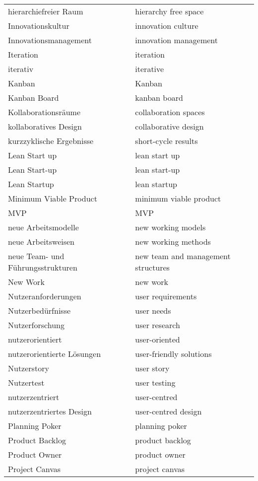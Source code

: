 \begin{spacing}{.5}
\begin{longtable}{ p{} p{}}
    hierarchiefreier Raum & hierarchy free space \\
    Innovationskultur & innovation culture \\
    Innovationsmanagement & innovation management \\
    Iteration & iteration \\
    iterativ & iterative \\
    Kanban & Kanban \\
    Kanban Board & kanban board \\
    Kollaborationsräume & collaboration spaces \\
    kollaboratives Design & collaborative design \\
    kurzzyklische Ergebnisse & short-cycle results \\
    Lean Start up & lean start up \\
    Lean Start-up & lean start-up \\
    Lean Startup & lean startup \\
    Minimum Viable Product & minimum viable product \\
    MVP & MVP \\
    neue Arbeitsmodelle & new working models \\
    neue Arbeitsweisen & new working methods \\
    neue Team- und Führungsstrukturen & new team and management structures \\
    New Work & new work \\
    Nutzeranforderungen & user requirements \\
    Nutzerbedürfnisse & user needs \\
    Nutzerforschung & user research \\
    nutzerorientiert & user-oriented \\
    nutzerorientierte Lösungen & user-friendly solutions \\
    Nutzerstory & user story \\
    Nutzertest & user testing \\
    nutzerzentriert & user-centred \\
    nutzerzentriertes Design & user-centred design \\
    Planning Poker & planning poker \\
    Product Backlog & product backlog \\
    Product Owner & product owner \\
    Project Canvas & project canvas \\

\end{longtable}
\end{spacing}
